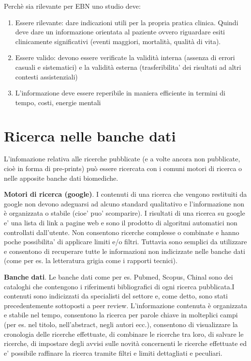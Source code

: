 \documentclass[]{book}
\begin{document}
Perchè sia rilevante per EBN uno studio deve:

\begin{enumerate}
\def\labelenumi{\arabic{enumi})}
\item
  Essere rilevante: dare indicazioni utili per la propria pratica clinica. Quindi deve dare un informazione orientata al paziente ovvero riguardare esiti clinicamente significativi (eventi maggiori, mortalità, qualità di vita).
\item
  Essere valido: devono essere verificate la validità interna (assenza di errori casuali e sistematici) e la validità esterna (trasferibilita' dei risultati ad altri contesti assistenziali)
\item
  L'informazione deve essere reperibile in maniera efficiente in termini di tempo, costi, energie mentali
\end{enumerate}

\hypertarget{ricerca-nelle-banche-dati}{%
\section{Ricerca nelle banche dati}\label{ricerca-nelle-banche-dati}}

L'infomazione relativa alle ricerche pubblicate (e a volte ancora non pubblicate, cioè in forma di pre-prints) può essere ricercata con i comuni motori di ricerca o nelle apposite banche dati biomediche.

\textbf{Motori di ricerca (google)}. I contenuti di una ricerca che vengono restituiti da google non devono adeguarsi ad alcuno standard qualitativo e l'informazione non è organizzata o stabile (cioe' puo' scomparire). I risultati di una ricerca su google e' una lista di link a pagine web e sono il prodotto di algoritmi automatici non controllati dall'utente. Non consentono ricerche complesse o combinate e hanno poche possibilita' di applicare limiti e/o filtri. Tuttavia sono semplici da utilizzare e consentono di recuperare tutte le informazioni non indicizzate nelle banche dati (come per es. la letteratura grigia come i rapporti tecnici).

\textbf{Banche dati}. Le banche dati come per es. Pubmed, Scopus, Chinal sono dei cataloghi che contengono i riferimenti bibliografici di ogni ricerca pubblicata.I contenuti sono indicizzati da specialisti del settore e, come detto, sono stati precedentemente sottoposti a peer review. L'informazione contenuta è organizzata e stabile nel tempo, consentono la ricerca per parole chiave in molteplici campi (per es. nel titolo, nell'abstract, negli autori ecc.), consentono di visualizzare la cronologia delle ricerche effettuate, di combinare le ricerche tra loro, di salvare le ricerche, di impostare degli avvisi sulle novità concernenti le ricerche effettuate ed e' possibile raffinare la ricerca tramite filtri e limiti dettagliati e peculiari.
\end{document}
